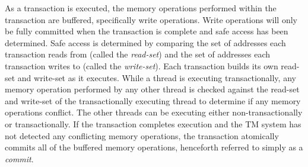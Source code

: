 \documentclass{sig-alternate}
\begin{document}





As a transaction is executed, the memory operations performed within the transaction are
buffered, specifically write operations.  Write operations will only be fully committed
when the transaction is complete and safe access has been determined.  Safe access is
determined by comparing the set of addresses each transaction reads from (called the
\emph{read-set}) and the set of addresses each transaction writes to (called the
\emph{write-set}).  Each transaction builds its own read-set and write-set as it executes.
While a thread is executing transactionally, any memory operation performed by any other
thread is checked against the read-set and write-set of the transactionally executing
thread to determine if any memory operations conflict.  The other threads can be executing
either non-transactionally or transactionally.  If the transaction completes execution and
the TM system has not detected any conflicting memory operations, the transaction
atomically commits all of the buffered memory operations, henceforth referred to simply as
a \emph{commit}.
\end{document}
